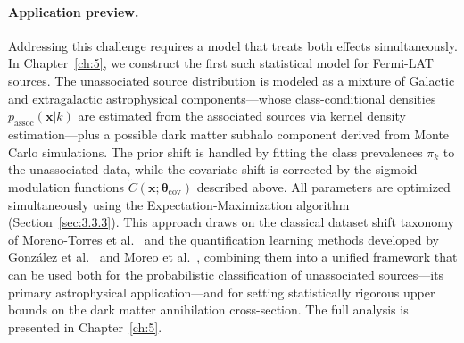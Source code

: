 \paragraph{Application preview.}

Addressing this challenge requires a model that treats both effects simultaneously.
In Chapter~\ref{ch:5}, we construct the first such statistical model for Fermi-LAT sources.
The unassociated source distribution is modeled as a mixture of Galactic and extragalactic astrophysical components---whose class-conditional densities $p_{\text{assoc}}(\mathbf{x}|k)$ are estimated from the associated sources via kernel density estimation---plus a possible dark matter subhalo component derived from Monte Carlo simulations.
The prior shift is handled by fitting the class prevalences $\pi_k$ to the unassociated data, while the covariate shift is corrected by the sigmoid modulation functions $\tilde{C}(\mathbf{x};\boldsymbol{\theta}_{\text{cov}})$ described above.
All parameters are optimized simultaneously using the Expectation-Maximization algorithm (Section~\ref{sec:3.3.3}).
This approach draws on the classical dataset shift taxonomy of Moreno-Torres et al.~\cite{MorenoTorres2012AUV} and the quantification learning methods developed by Gonz\'alez et al.~\cite{10.1145/3117807_Gonzalez_quantification} and Moreo et al.~\cite{2024arXiv240100490M}, combining them into a unified framework that can be used both for the probabilistic classification of unassociated sources---its primary astrophysical application---and for setting statistically rigorous upper bounds on the dark matter annihilation cross-section.
The full analysis is presented in Chapter~\ref{ch:5}.
